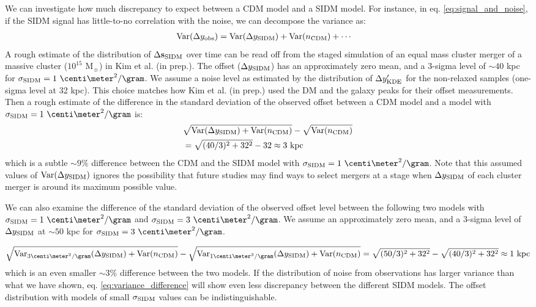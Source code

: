 We can investigate how much discrepancy to expect between a CDM model 
and a SIDM model. 
For instance, in eq. \ref{eq:signal_and_noise},
if the SIDM signal has little-to-no correlation with the noise, 
we can decompose the variance as:
\begin{align}
	\mathrm{Var}(\Delta y_{\rm obs}) &= \mathrm{Var}(\Delta y_{\rm SIDM}) + \mathrm{Var}(n_{\rm CDM}) + \cdots
\end{align}
A rough estimate of the distribution of $\Delta {\bf s}_{\rm SIDM}$ over time 
can be read off from the staged simulation of an equal mass cluster merger of a
massive cluster ($10^{15}$ M$_\sun$) in Kim et al. (in prep.).
The offset ($\Delta y_{\rm SIDM}$) has an approximately zero mean, and a 3-sigma level of
$\sim 40$ kpc for $\sigma_\SIDM = 1~\centi\meter^2 / \gram$.  
We assume a noise level as estimated by the distribution of $\Delta y_{\rm KDE}'$
for the non-relaxed samples (one-sigma level at 32 kpc). This choice matches 
how Kim et al. (in prep.) used the DM and the galaxy peaks for their
offset measurements. 
Then a rough estimate of the difference in the standard deviation of the observed offset 
between a CDM
model and a model with $\sigma_\SIDM = 1~\centi\meter^2 / \gram$ is:
\begin{align}
	&	\sqrt{\mathrm{Var}(\Delta y_{\rm SIDM}) + \mathrm{Var}(n_{\rm CDM})} - \sqrt{\mathrm{Var}(n_{\rm CDM})} \\ 
&=	\sqrt{(40 / 3)^2 + 32^2} - 32 \approx 3~\mathrm{kpc} 
\end{align}
which is a subtle $\sim 9 \%$ difference between the CDM and the SIDM model with
$\sigma_\SIDM = 1~\centi \meter^2 / \gram$. 
Note that this assumed values of $\mathrm{Var}(\Delta y_{\rm SIDM})$  
ignores the possibility
that future studies may find ways to select mergers at a stage when $\Delta y_{\rm SIDM}$
of each cluster merger is around its maximum possible value. 

We can also examine the difference of the standard deviation of the observed
offset level between the following two models with 
$\sigma_\SIDM =1~\centi\meter^2 / \gram$ and  $\sigma_\SIDM = 3~\centi\meter^2 / \gram$.
We assume an approximately zero mean, and a 3-sigma level of $\Delta y_{\rm SIDM}$
at $\sim 50$ kpc for $\sigma_\SIDM =
3~\centi\meter^2 / \gram$.

\begin{dmath}
	\sqrt{\Var_{3\centi\meter^2/\gram}(\Delta y_\SIDM) + \Var(n_{\rm CDM})} \hfill -
	 \sqrt{\Var_{1\centi\meter^2/\gram}(\Delta y_{\SIDM}) +\Var(n_{\rm
	CDM})}\label{eq:variance_difference} \\
=\sqrt{(50 / 3)^2 + 32^2} - \sqrt{(40 / 3)^2 + 32^2} \approx 1~\mathrm{kpc} 
\end{dmath}
which is an even smaller $\sim 3\%$ difference between the two models. 
If the distribution of noise from observations has larger variance than what we
have shown, eq. \ref{eq:variance_difference} will show even less discrepancy
between the different SIDM models. 
The offset distribution with models of small $\sigma_{\rm SIDM}$ values 
can be indistinguishable.  

